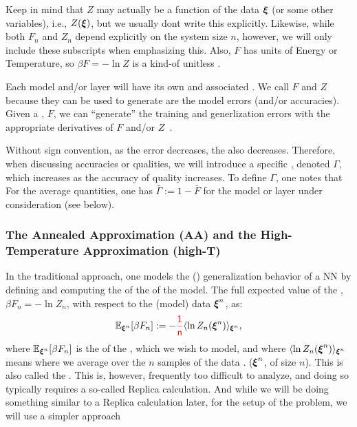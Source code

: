 Keep in mind that $Z$ may actually be a function of the data $\boldsymbol{\xi}$ (or some other variables),
i.e., $Z(\boldsymbol{\xi})$, but we usually dont write this explicitly.
Likewise, while  both $F_n$ and $Z_n$ depend explicitly on the system size $n$, however,
we will only include these subscripts when emphasizing this.
Also, $F$ has units of Energy or Temperature, so $\beta F=-\ln Z$ is a kind-of unitless \FreeEnergy.

Each model and/or layer will have its own \PartitionFunction and associated \GeneratingFunctions.
We call $F$ and $Z$ \emph{\GeneratingFunctions} because they can be used to generate are the model errors (and/or accuracies). 
Given a \FreeEnergy, $F$, we can ``generate'' the training and generlization errors with the appropriate derivatives of $F$ and/or $Z$~\cite{LTS90, Solla2023}.

Without sign convention,  as the error decreases, the \FreeEnergy also decreases.
Therefore, when discussing accuracies or qualities,
we will introduce a specific \GeneratingFunction, denoted $\Gamma$, which increases
as the accuracy of quality increases.  To define $\Gamma$, one notes that
For the average quantities, one has
 $\bar{\Gamma}:=1-\bar{F}$ for the model or layer under consideration (see below).


\subsubsection{The Annealed Approximation (AA) and the High-Temperature Approximation (high-T)}
\label{sxn:mathP_annealed}

In the traditional \SMOG approach, one models the (\Typical) generalization behavior of a NN
by defining and computing the \ExpectedValue of the \FreeEnergy of the model.
The full expected value  of the \FreeEnergy, $\beta F_{n}=-\ln Z_{n}$, with respect to the (model)
  data $\boldsymbol{\xi}^{n}$, as:
\begin{align}
  \mathbb{E}_{\boldsymbol{\xi}^{n}}[\beta F_n]:=-{\color{red}\sf{\frac{1}{n}}}\langle \ln Z_{n}(\boldsymbol{\xi}^{n})\rangle_{\boldsymbol{\xi}^{n}},
\end{align}
where $\mathbb{E}_{\boldsymbol{\xi}^{n}}[\beta F_n]$ is the \ExpectedValue of the \FreeEnergy, which we wish to model, and 
where $\langle \ln Z_{n}(\boldsymbol{\xi}^{n})\rangle_{\boldsymbol{\xi}^{n}}$ means where we average over  the $n$ samples of the data .
($\boldsymbol{\xi}^{n}$, of size $n$).  This is also called the \Quenched \FreeEnergy.
This is, however,  frequently too difficult to analyze, and doing so typically
requires a so-called Replica calculation. And while we will be doing something similar
to a Replica calculation later, for the setup of the problem, we will use a simpler approach

